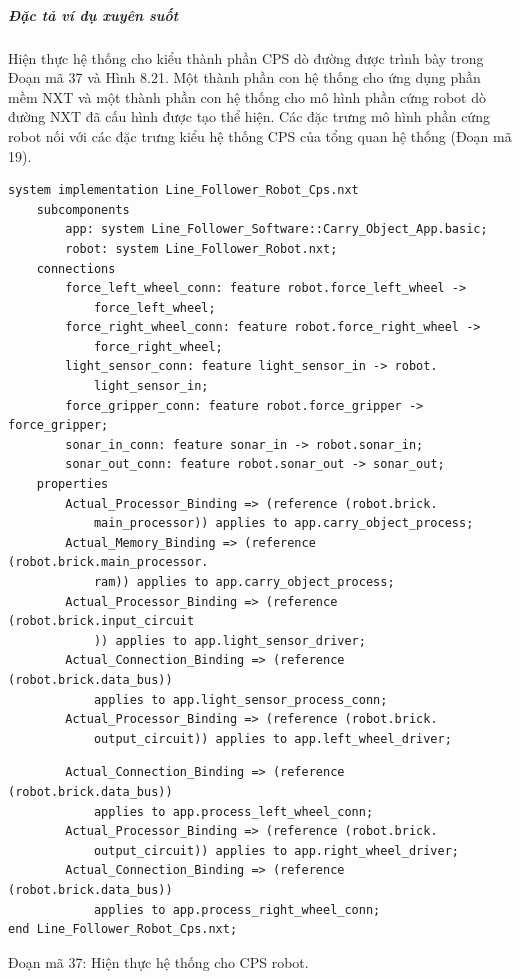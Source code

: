 \subparagraph{Đặc tả ví dụ xuyên suốt}
Hiện thực hệ thống cho kiểu thành phần CPS dò đường được trình bày trong Đoạn mã 37 và Hình 8.21. Một thành phần con hệ thống cho ứng dụng phần mềm NXT và một thành phần con hệ thống cho mô hình phần cứng robot dò đường NXT đã cấu hình được tạo thể hiện. Các đặc trưng mô hình phần cứng robot nối với các đặc trưng kiểu hệ thống CPS của tổng quan hệ thống (Đoạn mã 19).
\begin{verbatim}
system implementation Line_Follower_Robot_Cps.nxt
    subcomponents
        app: system Line_Follower_Software::Carry_Object_App.basic;
        robot: system Line_Follower_Robot.nxt;
    connections
        force_left_wheel_conn: feature robot.force_left_wheel ->
            force_left_wheel;
        force_right_wheel_conn: feature robot.force_right_wheel ->
            force_right_wheel;
        light_sensor_conn: feature light_sensor_in -> robot.
            light_sensor_in;
        force_gripper_conn: feature robot.force_gripper -> force_gripper;
        sonar_in_conn: feature sonar_in -> robot.sonar_in;
        sonar_out_conn: feature robot.sonar_out -> sonar_out;
    properties
        Actual_Processor_Binding => (reference (robot.brick.
            main_processor)) applies to app.carry_object_process;
        Actual_Memory_Binding => (reference (robot.brick.main_processor.
            ram)) applies to app.carry_object_process;
        Actual_Processor_Binding => (reference (robot.brick.input_circuit
            )) applies to app.light_sensor_driver;
        Actual_Connection_Binding => (reference (robot.brick.data_bus))
            applies to app.light_sensor_process_conn;
        Actual_Processor_Binding => (reference (robot.brick.
            output_circuit)) applies to app.left_wheel_driver;
\end{verbatim}
\begin{verbatim}
        Actual_Connection_Binding => (reference (robot.brick.data_bus))
            applies to app.process_left_wheel_conn;
        Actual_Processor_Binding => (reference (robot.brick.
            output_circuit)) applies to app.right_wheel_driver;
        Actual_Connection_Binding => (reference (robot.brick.data_bus))
            applies to app.process_right_wheel_conn;
end Line_Follower_Robot_Cps.nxt;
\end{verbatim}
\begin{center}\small Đoạn mã 37: Hiện thực hệ thống cho CPS robot.\end{center}

